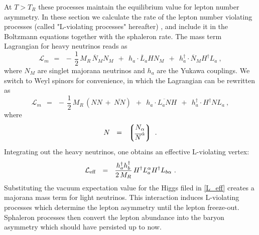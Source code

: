 \documentclass[12pt]{revtex4}
\newcommand{\ov}{\overline}
\begin{document}
	At $ T > T_R $ these processes maintain the equilibrium value for 
	lepton number asymmetry. 
	In these section we calculate the rate of the lepton number violating processes 
(called "L-violating processes"
hereafter) , and include it
	in the Boltzmann equations together with the sphaleron rate.
The mass term Lagrangian for heavy neutrinos reads as
\begin{equation}
	\mathcal{L}_m  ~~=~~ -\,\frac 12\, M_R\, \ov{N}{}_MN_M ~~+~~
				h_a\cdot \ov{L}_aHN_M ~~+~~  
				h_a^\dagger\cdot \ov{N}{}_MH^\dagger L_a~,
\end{equation}
	where $ N_M $ are singlet majorana neutrinos and $ h_a $ are the Yukawa couplings.
	We switch to Weyl spinors for convenience, in which the Lagrangian can be rewritten as
\begin{equation}
	\mathcal{L}_m  ~~=~~ 
	-\,\frac 12\, M_R\, \left( NN ~+~ \ov{N N} \right) ~~+~~
				h_a\cdot \ov{L_a N}H ~~+~~  
				h_a^\dagger\cdot H^\dagger N L_a~,
\end{equation}
	where
\[	
	N  ~~=~~ \left\lgroup 
		\begin{matrix}
			N_\alpha \\
			\ov{N}^{\dot{\alpha}}
		\end{matrix}
		\right\rgroup~.
\]
	Integrating out the heavy neutrinos, one obtains an effective L-violating vertex:
\begin{equation}
\label{L_eff}
	\mathcal{L}_{\rm eff} ~~=~~ \frac{h_a^\dag h_b^\dag}{2\, M_R} \, H^\dag L_a^\alpha H^\dag L_{b\alpha}~.
\end{equation}
	Substituting the vacuum expectation value 
for the Higgs filed in \eqref{L_eff}
	creates a majorana mass term for light neutrinos. This interaction induces 
L-violating processes which determine the lepton asymmetry
	until the lepton freeze-out. 
	Sphaleron processes then convert the lepton abundance into the baryon asymmetry which
	should have persisted up to now. 

\end{document}
